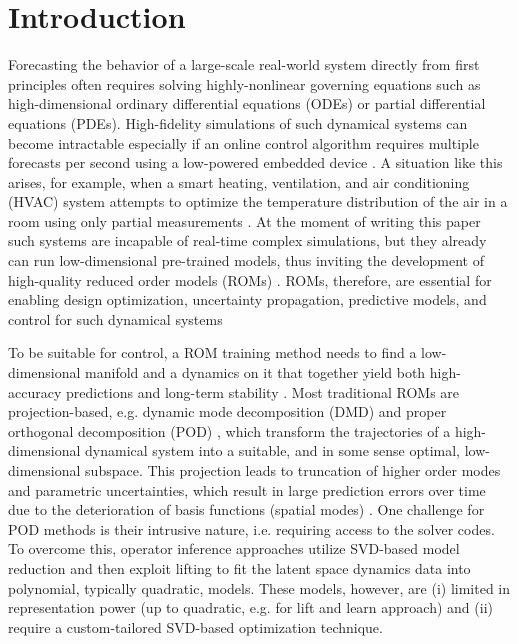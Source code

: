 
\section{Introduction}
   
        Forecasting the behavior of a large-scale real-world system directly from first principles often requires solving highly-nonlinear governing equations such as high-dimensional ordinary differential equations (ODEs) or partial differential equations (PDEs). 
        High-fidelity simulations of such dynamical systems can become intractable especially if an online control algorithm requires multiple forecasts per second using a low-powered embedded device \cite{rowley2017model,lucia2004reduced,benner2015survey}. A situation like this arises, for example, when a smart heating, ventilation, and air conditioning (HVAC) system attempts to optimize the temperature distribution of the air in a room using only partial measurements \cite{farahmand2016learning,nabi2022robust}. At the moment of writing this paper such systems are incapable of real-time complex simulations, but they already can run low-dimensional pre-trained models, thus inviting the development of high-quality reduced order models (ROMs) \cite{otterness2017evaluation} . ROMs, therefore, are essential for enabling design optimization, uncertainty propagation, predictive models, and control for such dynamical systems \cite{brunton2022data,kutz2016dynamic,rowley2017model,jones2020characterising}
        
        To be suitable for control, a ROM training method needs to find a low-dimensional manifold and a dynamics on it that together yield both high-accuracy predictions and long-term stability \cite{ahmed2021closures,noack2011reduced}. Most traditional ROMs are projection-based, e.g. dynamic mode decomposition (DMD) \cite{kutz2016dynamic,tu2013dynamic} and proper orthogonal decomposition (POD) \cite{holmes2012turbulence}, which transform the trajectories of a high-dimensional dynamical system into a suitable, and in some sense optimal, low-dimensional subspace. This projection leads to truncation of higher order modes and parametric uncertainties, which result in large prediction errors over time due to the deterioration of basis functions (spatial modes) \cite{benner2015survey}. 
        One challenge for POD methods is their intrusive nature, i.e. requiring access to the solver codes.
       To overcome this, operator inference approaches \cite{qian2020lift,peherstorfer2016data} utilize SVD-based model reduction and then exploit lifting to fit the latent space dynamics data into
        polynomial, typically quadratic, models.
        These models, however, are (i) limited in representation power (up to quadratic, e.g. for lift and learn approach) and (ii) require a custom-tailored SVD-based optimization technique. 
        
